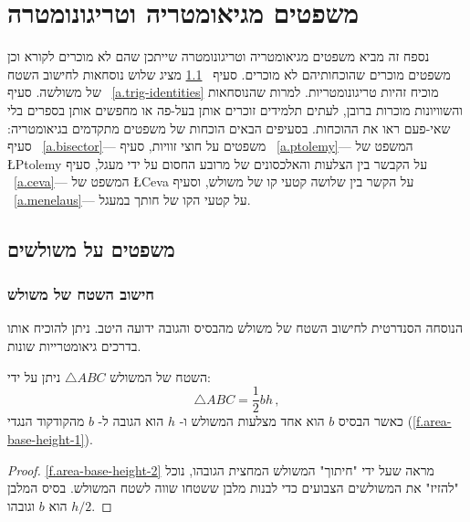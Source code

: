 

\chapter{משפטים מגיאומטריה וטריגונומטרה}\label{a.trig}


נספח זה מביא משפטים מגיאומטריה וטריגונומטרה שייתכן שהם לא מוכרים לקורא וכן משפטים מוכרים שהוכחותיהם לא מוכרים. סעיף%
~\ref{a.triangles}
מציג שלוש נוסחאות לחישוב השטח של משולשה. סעיף%
~\ref{a.trig-identities}
מוכיח זהיות טריגונומטריות. למרות שהנוסחאות והשוויונות מוכרות ברובן, לעתים תלמידים זוכרים אותן בעל-פה או מחפשים אותן בספרים בלי שאי-פעם ראו את ההוכחות. בסעיפים הבאים הוכחות של משפטים מתקדמים בגיאומטריה: סעיף%
~\ref{a.bisector}---%
משפטים על חוצי זוויות, סעיף%
~\ref{a.ptolemy}---%
המשפט של
\L{Ptolemy}
על הקבשר בין הצלעות והאלכסונים של מרובע החסום על ידי מעגל, סעיף%
~\ref{a.ceva}---%
המשפט של
\L{Ceva}
על הקשר בין שלושה קטעי קו של משולש, וסעיף%
~\ref{a.menelaus}---%
על קטעי הקו של חותך במעגל.



\section{משפטים על משולשים}\label{a.triangles}


\subsection{חישוב השטח של משולש}

הנוסחה הסנדרטית לחישוב השטח של משולש מהבסיס והגובה ידועה היטב. ניתן להוכיח אותו בדרכים גיאומטרייות שונות.

\begin{theorem} 
השטח של המשולש 
$\triangle ABC$
ניתן על ידי:
\begin{equation}\label{eq.area-from-base}
\triangle ABC=\frac{1}{2}bh\,,
\end{equation}
כאשר הבסיס 
$b$
הוא אחד מצלעות המשולש ו-%
$h$
הוא הגובה ל-%
$b$
מהקודקוד הנגדי
(\ref{f.area-base-height-1}).
\end{theorem}

\begin{proof}
\ref{f.area-base-height-2}
מראה שעל ידי "חיתוך" המשולש המחצית הגובהו, נוכל "להזיז" את המשולשים הצבועים כדי לבנות מלבן ששטחו שווה לשטח המשולש. בסיס המלבן הוא 
$b$
וגובהו
$h/2$.
\end{proof}

